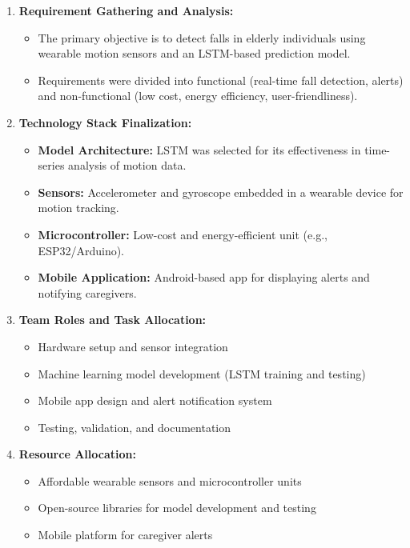 \documentclass[a4paper, 12pt]{report}
\begin{document}
\begin{enumerate}[itemsep=-4pt, label=\textbf{\roman*.}]
    \item \textbf{Requirement Gathering and Analysis: }
    \vspace{-4pt}
    \begin{itemize}[itemsep=-4pt]
        \item The primary objective is to detect falls in elderly individuals using wearable motion sensors and an LSTM-based prediction model.
        \item Requirements were divided into functional (real-time fall detection, alerts) and non-functional (low cost, energy efficiency, user-friendliness).
    \end{itemize}

    \item \textbf{Technology Stack Finalization: }
    \vspace{-4pt}
    \begin{itemize}[itemsep=-4pt]
        \item \textbf{Model Architecture:} LSTM was selected for its effectiveness in time-series analysis of motion data.
        \item \textbf{Sensors:} Accelerometer and gyroscope embedded in a wearable device for motion tracking.
        \item \textbf{Microcontroller:} Low-cost and energy-efficient unit (e.g., ESP32/Arduino).
        \item \textbf{Mobile Application:} Android-based app for displaying alerts and notifying caregivers.
    \end{itemize}

    \item \textbf{Team Roles and Task Allocation: }
    \vspace{-4pt}
    \begin{itemize}[itemsep=-4pt]
        \item Hardware setup and sensor integration
        \item Machine learning model development (LSTM training and testing)
        \item Mobile app design and alert notification system
        \item Testing, validation, and documentation
    \end{itemize}

    \item \textbf{Resource Allocation: }
    \vspace{-4pt}
    \begin{itemize}[itemsep=-4pt]
        \item Affordable wearable sensors and microcontroller units
        \item Open-source libraries for model development and testing
        \item Mobile platform for caregiver alerts
    \end{itemize}


\end{enumerate}
\end{document}
